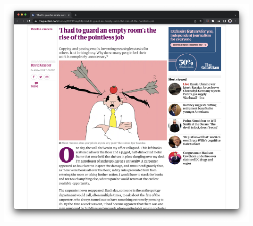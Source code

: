 \documentclass[aspectratio=43,17pt]{beamer} %
\begin{document}
\begin{frame}[plain]


\end{frame}


\begin{frame}[plain]
\begin{columns}
\begin{column}{0.7\textwidth}
    \includegraphics[width=\textwidth]{figures/news/bullshit.png}
\end{column}
\begin{column}{0.3\textwidth}

\end{column}
\end{columns}
\end{frame}
\end{document}
